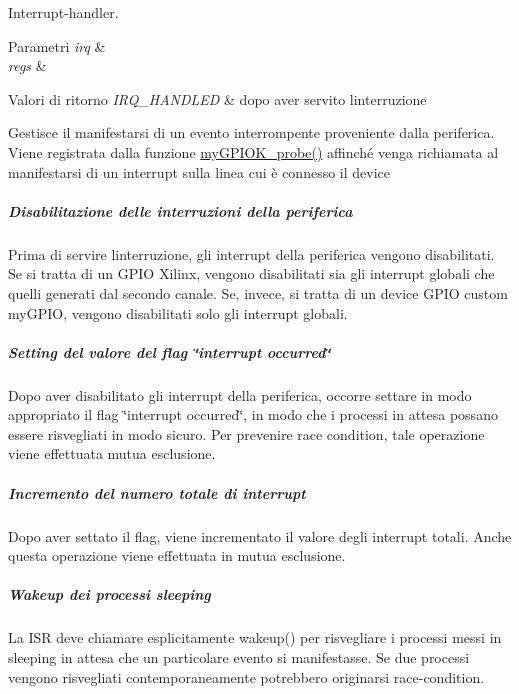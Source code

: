 Interrupt-\/handler. 


\begin{DoxyParams}{Parametri}
{\em irq} & \\
\hline
{\em regs} & \\
\hline
\end{DoxyParams}

\begin{DoxyRetVals}{Valori di ritorno}
{\em I\+R\+Q\+\_\+\+H\+A\+N\+D\+L\+ED} & dopo aver servito l\textquotesingle{}interruzione\\
\hline
\end{DoxyRetVals}
Gestisce il manifestarsi di un evento interrompente proveniente dalla periferica. Viene registrata dalla funzione \hyperlink{group___linux-_driver_gae40973a06d72f7c41a9af07513a62307}{my\+G\+P\+I\+O\+K\+\_\+probe()} affinché venga richiamata al manifestarsi di un interrupt sulla linea cui è connesso il device \subparagraph*{Disabilitazione delle interruzioni della periferica}

Prima di servire l\textquotesingle{}interruzione, gli interrupt della periferica vengono disabilitati. Se si tratta di un G\+P\+IO Xilinx, vengono disabilitati sia gli interrupt globali che quelli generati dal secondo canale. Se, invece, si tratta di un device G\+P\+IO custom my\+G\+P\+IO, vengono disabilitati solo gli interrupt globali.

\subparagraph*{Setting del valore del flag \char`\"{}interrupt occurred\char`\"{}}

Dopo aver disabilitato gli interrupt della periferica, occorre settare in modo appropriato il flag \char`\"{}interrupt occurred\char`\"{}, in modo che i processi in attesa possano essere risvegliati in modo sicuro. Per prevenire race condition, tale operazione viene effettuata mutua esclusione.

\subparagraph*{Incremento del numero totale di interrupt}

Dopo aver settato il flag, viene incrementato il valore degli interrupt totali. Anche questa operazione viene effettuata in mutua esclusione.

\subparagraph*{Wakeup dei processi sleeping}

La I\+SR deve chiamare esplicitamente wakeup() per risvegliare i processi messi in sleeping in attesa che un particolare evento si manifestasse. Se due processi vengono risvegliati contemporaneamente potrebbero originarsi race-\/condition.\mbox{\label{group___linux-_driver_ga66e7f726b72320a272b633ecbaecefff}} 
